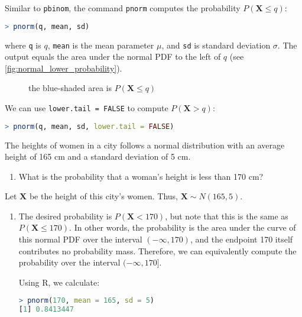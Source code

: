 Similar to \verb|pbinom|, the command \verb|pnorm| computes the probability \( P(\bm{X} \leq q) \):
\begin{lstlisting}[language=R]
> pnorm(q, mean, sd)
\end{lstlisting}
where \verb|q| is \( q \), \verb|mean| is the mean parameter \( \mu \), and \verb|sd| is standard deviation \( \sigma \).
The output equals the area under the normal PDF to the left of \( q \) (see \autoref{fig:normal_lower_probability}).
\begin{figure}[t]
\begin{center}
\end{center}
\caption{the blue-shaded area is \( P(\bm{X} \leq q) \)}
\label{fig:normal_lower_probability}
\end{figure}

We can use \verb|lower.tail = FALSE| to compute \( P(\bm{X} > q) \):
\begin{lstlisting}[language=R]
> pnorm(q, mean, sd, lower.tail = FALSE)
\end{lstlisting}

\begin{exmp}
    The heights of women in a city follows a normal distribution with an average height of 165 cm and a standard deviation of 5 cm.
    \begin{enumerate}
        \item What is the probability that a woman's height is less than 170 cm?
    \end{enumerate}
\end{exmp}
\begin{solution}
    Let \( \bm{X} \) be the height of this city's women.
    Thus, \( \bm{X} \sim N(165, 5) \).
    \begin{enumerate}
        \item The desired probability is \( P(\bm{X} < 170) \), but note that this is the same as \( P(\bm{X} \leq 170) \).
        In other words, the probability is the area under the curve of this normal PDF over the interval \( (-\infty, 170) \),
        and the endpoint 170 itself contributes no probability mass.
        Therefore, we can equivalently compute the probability over the interval \( (-\infty, 170] \).

        Using R, we calculate:
        \begin{lstlisting}[language=R]
> pnorm(170, mean = 165, sd = 5)
[1] 0.8413447
        \end{lstlisting}
        
    \end{enumerate}
\end{solution}